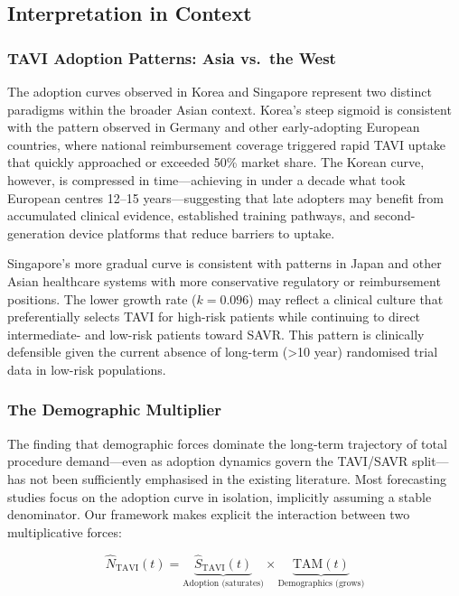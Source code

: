\documentclass[12pt, a4paper]{article}
\begin{document}
\subsection{Interpretation in Context}

\subsubsection{TAVI Adoption Patterns: Asia vs.\ the West}

The adoption curves observed in Korea and Singapore represent two distinct paradigms within the broader Asian context. Korea's steep sigmoid is consistent with the pattern observed in Germany and other early-adopting European countries, where national reimbursement coverage triggered rapid TAVI uptake that quickly approached or exceeded 50\% market share. The Korean curve, however, is compressed in time---achieving in under a decade what took European centres 12--15 years---suggesting that late adopters may benefit from accumulated clinical evidence, established training pathways, and second-generation device platforms that reduce barriers to uptake.

Singapore's more gradual curve is consistent with patterns in Japan and other Asian healthcare systems with more conservative regulatory or reimbursement positions. The lower growth rate ($k = 0.096$) may reflect a clinical culture that preferentially selects TAVI for high-risk patients while continuing to direct intermediate- and low-risk patients toward SAVR. This pattern is clinically defensible given the current absence of long-term ({>}10 year) randomised trial data in low-risk populations.

\subsubsection{The Demographic Multiplier}

The finding that demographic forces dominate the long-term trajectory of total procedure demand---even as adoption dynamics govern the TAVI/SAVR split---has not been sufficiently emphasised in the existing literature. Most forecasting studies focus on the adoption curve in isolation, implicitly assuming a stable denominator. Our framework makes explicit the interaction between two multiplicative forces:

\begin{equation}
    \hat{N}_{\mathrm{TAVI}}(t) = \underbrace{\hat{S}_{\mathrm{TAVI}}(t)}_{\text{Adoption (saturates)}} \times \underbrace{\mathrm{TAM}(t)}_{\text{Demographics (grows)}}
\end{equation}
\end{document}
